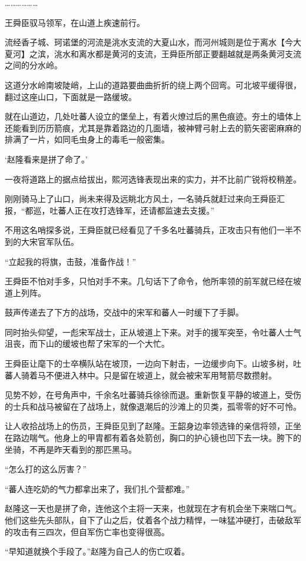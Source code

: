 ………………

王舜臣驭马领军，在山道上疾速前行。

流经香子城、珂诺堡的河流是洮水支流的大夏山水，而河州城则是位于离水【今大夏河】之滨，洮水和离水都是黄河的支流，王舜臣所部正要翻越就是两条黄河支流之间的分水岭。

这道分水岭南坡陡峭，上山的道路要曲曲折折的绕上两个回弯。可北坡平缓得很，翻过这座山口，下面就是一路缓坡。

就在山道边，几处吐蕃人设立的堡垒上，有着火燎过后的黑色痕迹。夯土的墙体上还能看到历历箭痕，尤其是靠着路边的几面墙，被神臂弓射上去的箭矢密密麻麻的排满了一片，如同毛虫身上的毒毛一般密集。

‘赵隆看来是拼了命了。’

一夜将道路上的据点给拔出，熙河选锋表现出来的实力，并不比前广锐将校稍差。

刚刚骑马上了山口，尚未来得及远眺北方风土，一名骑兵就赶过来向王舜臣汇报，“都巡，吐蕃人正在攻打选锋军，还请都监速去支援。”

不用这名哨探多说，王舜臣就已经看见了千多名吐蕃骑兵，正攻击只有他们一半不到的大宋官军队伍。

“立起我的将旗，击鼓，准备作战！”

王舜臣不怕对手多，只怕对手不来。几句话下了命令，他所率领的前军就已经在坡道上列阵。

鼓声传递去了下方的战场，交战中的宋军和蕃人一时缓下了手脚。

同时抬头仰望，一彪宋军战士，正从坡道上下来。对手的援军突至，令吐蕃人士气沮丧，而下山的缓坡也帮了宋军的一个大忙。

王舜臣让麾下的士卒横队站在坡顶，一边向下射击，一边缓步向下。山坡多树，吐蕃人骑着马不便进入林中。只是留在坡道上，就会被宋军用弩箭尽数攒射。

见势不妙，在号角声中，千余名吐蕃骑兵徐徐而退。重新恢复平静的坡道上，受伤的士兵和战马被留在了战场上，就像退潮后的沙滩上的贝类，孤零零的好不可怜。

让人收拾战场上的伤员，王舜臣见到了赵隆。王韶身边率领选锋的亲信将领，正坐在路边喘气。他身上的甲胄都有着各处箭创，胸口的护心镜也凹下去一块。胯下的坐骑，不再是昨天看到的那匹黑马。

“怎么打的这么厉害？”

“蕃人连吃奶的气力都拿出来了，我们扎个营都难。”

赵隆这一天也是拼了命，连他这个主将一天来，也就现在才有机会坐下来喘口气。他们这些先头部队，自下了山之后，仗着各个战力精悍，一味猛冲硬打，击破敌军的攻击有三四次，但自军伤亡率也变得很高。

“早知道就换个手段了。”赵隆为自己人的伤亡叹着。

